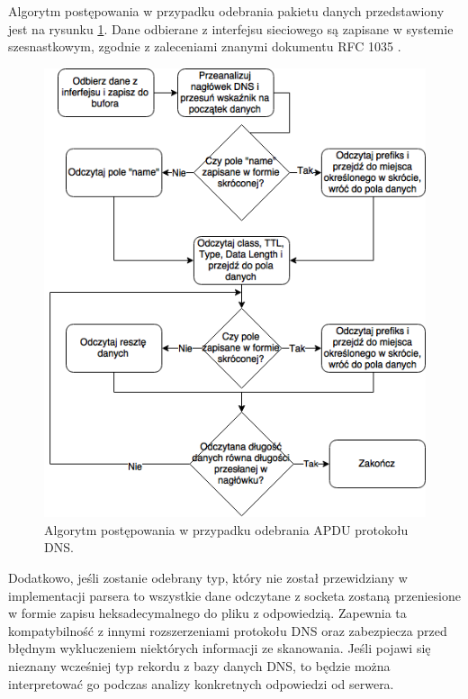 Algorytm postępowania w przypadku odebrania pakietu danych przedstawiony jest na rysunku \ref{fig:receiving}. Dane odbierane z interfejsu
sieciowego są zapisane w systemie szesnastkowym, zgodnie z zaleceniami znanymi dokumentu RFC 1035 \cite{RFC1035}.

\begin{figure}[ht]
	\centering
	\includegraphics[width=1.0\textwidth]{image/receiving}
	\caption{Algorytm postępowania w przypadku odebrania APDU protokołu DNS.}
	\label{fig:receiving}
\end{figure}

Dodatkowo, jeśli zostanie odebrany typ, który nie został przewidziany w implementacji parsera to wszystkie dane odczytane z
socketa zostaną przeniesione w formie zapisu heksadecymalnego do pliku z odpowiedzią. Zapewnia ta kompatybilność z innymi
rozszerzeniami protokołu DNS oraz zabezpiecza przed błędnym wykluczeniem niektórych informacji ze skanowania. Jeśli pojawi
się nieznany wcześniej typ rekordu z bazy danych DNS, to będzie można interpretować go podczas analizy konkretnych odpowiedzi
od serwera.

